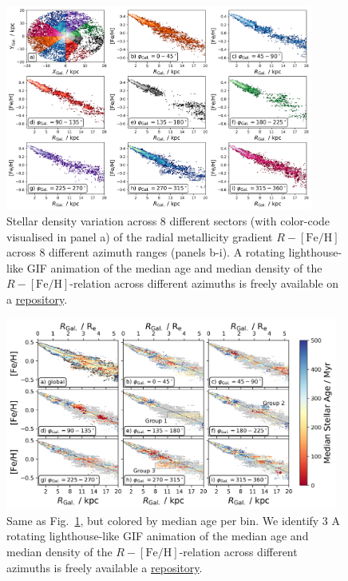 \documentclass[fleqn,usenatbib]{mnras}
\begin{document}
\begin{figure}
    \centering
    \includegraphics[width=0.9\textwidth]{figures/radial_metallicity_gradients_mw_in_angles.png}
    \caption{Stellar density variation across 8 different sectors (with color-code visualised in panel a) of the radial metallicity gradient $R-\mathrm{[Fe/H]}$ across 8 different azimuth ranges (panels b-i). A rotating lighthouse-like GIF animation of the median age and median density of the $R-\mathrm{[Fe/H]}$-relation across different azimuths is freely available on a \href{https://github.com/svenbuder/nihao_radial_metallicity_gradients/blob/main/figures/xyz_rfeh.gif}{repository}.}
    \label{fig:radial_metallicity_gradients_mw_in_angles}
\end{figure}

\begin{figure}
    \centering
    \includegraphics[width=0.975\textwidth]{figures/radial_metallicity_gradients_mw_in_angles_age.png}
    \caption{Same as Fig.~\ref{fig:radial_metallicity_gradients_mw_in_angles}, but colored by median age per bin. We identify 3  A rotating lighthouse-like GIF animation of the median age and median density of the $R-\mathrm{[Fe/H]}$-relation across different azimuths is freely available a \href{https://github.com/svenbuder/nihao_radial_metallicity_gradients/blob/main/figures/xyz_rfeh.gif}{repository}.}
    \label{fig:radial_metallicity_gradients_mw_in_angles_age}
\end{figure}
\end{document}
